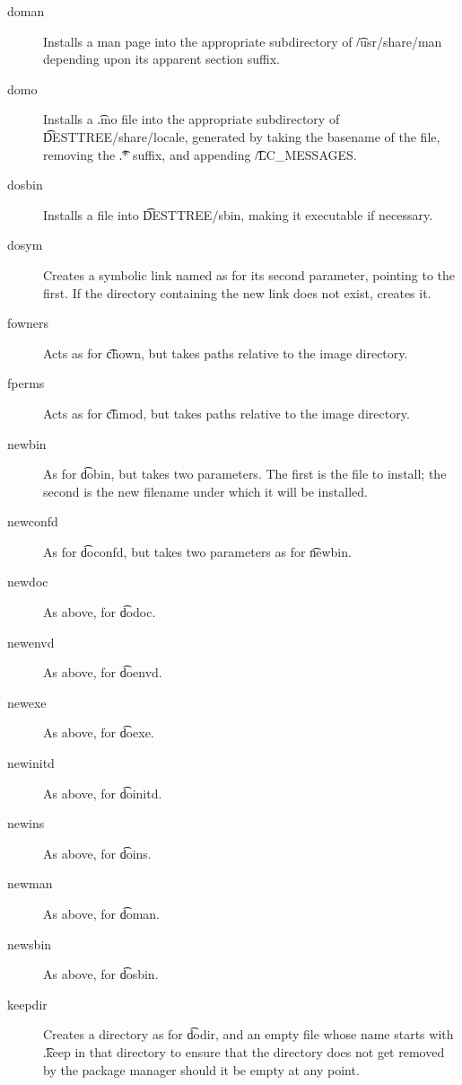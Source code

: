 \begin{description}
\item[doman] Installs a man page into the appropriate subdirectory of \t{/usr/share/man} depending
    upon its apparent section suffix.

\item[domo] Installs a \t{.mo} file into the appropriate subdirectory of \t{DESTTREE/share/locale},
    generated by taking the basename of the file, removing the \t{.*} suffix, and appending
    \t{/LC\_MESSAGES}.

\item[dosbin] Installs a file into \t{DESTTREE/sbin}, making it executable if necessary.

\item[dosym] Creates a symbolic link named as for its second parameter, pointing to the first. If
    the directory containing the new link does not exist, creates it.

\item[fowners] Acts as for \t{chown}, but takes paths relative to the image directory.

\item[fperms] Acts as for \t{chmod}, but takes paths relative to the image directory.

\item[newbin] As for \t{dobin}, but takes two parameters. The first is the file to install; the
    second is the new filename under which it will be installed.

\item[newconfd] As for \t{doconfd}, but takes two parameters as for \t{newbin}.

\item[newdoc] As above, for \t{dodoc}.

\item[newenvd] As above, for \t{doenvd}.

\item[newexe] As above, for \t{doexe}.

\item[newinitd] As above, for \t{doinitd}.

\item[newins] As above, for \t{doins}.

\item[newman] As above, for \t{doman}.

\item[newsbin] As above, for \t{dosbin}.

\item[keepdir] Creates a directory as for \t{dodir}, and an empty file whose name starts with
    \t{.keep} in that directory to ensure that the directory does not get removed by the
    package manager should it be empty at any point.


\end{description}

